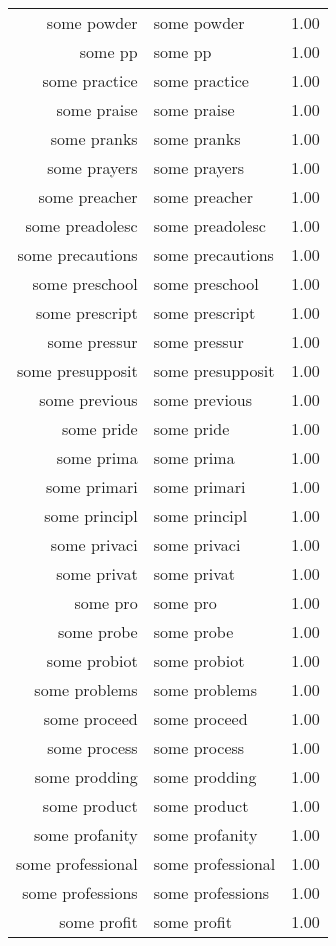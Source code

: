 \begin{table}[ht]
\begin{tabular}{rlr}
  some powder & some powder & 1.00 \\ 
  some pp & some pp & 1.00 \\ 
  some practice & some practice & 1.00 \\ 
  some praise & some praise & 1.00 \\ 
  some pranks & some pranks & 1.00 \\ 
  some prayers & some prayers & 1.00 \\ 
  some preacher & some preacher & 1.00 \\ 
  some preadolesc & some preadolesc & 1.00 \\ 
  some precautions & some precautions & 1.00 \\ 
  some preschool & some preschool & 1.00 \\ 
  some prescript & some prescript & 1.00 \\ 
  some pressur & some pressur & 1.00 \\ 
  some presupposit & some presupposit & 1.00 \\ 
  some previous & some previous & 1.00 \\ 
  some pride & some pride & 1.00 \\ 
  some prima & some prima & 1.00 \\ 
  some primari & some primari & 1.00 \\ 
  some principl & some principl & 1.00 \\ 
  some privaci & some privaci & 1.00 \\ 
  some privat & some privat & 1.00 \\ 
  some pro & some pro & 1.00 \\ 
  some probe & some probe & 1.00 \\ 
  some probiot & some probiot & 1.00 \\ 
  some problems & some problems & 1.00 \\ 
  some proceed & some proceed & 1.00 \\ 
  some process & some process & 1.00 \\ 
  some prodding & some prodding & 1.00 \\ 
  some product & some product & 1.00 \\ 
  some profanity & some profanity & 1.00 \\ 
  some professional & some professional & 1.00 \\ 
  some professions & some professions & 1.00 \\ 
  some profit & some profit & 1.00 \\ 

\end{tabular}
\end{table}
